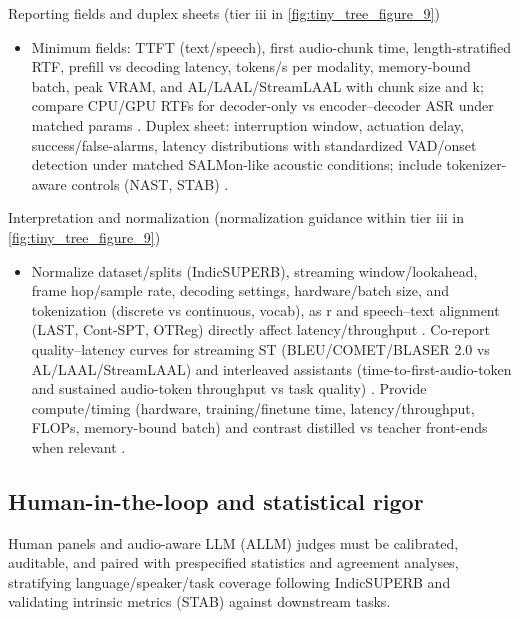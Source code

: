 \documentclass{article}
\begin{document}
Reporting fields and duplex sheets (tier iii in \autoref{fig:tiny_tree_figure_9})
\begin{itemize}
  \item Minimum fields: TTFT (text/speech), first audio-chunk time, length-stratified RTF, prefill vs decoding latency, tokens/s per modality, memory-bound batch, peak VRAM, and AL/LAAL/StreamLAAL with chunk size and k; compare CPU/GPU RTFs for decoder-only vs encoder--decoder ASR under matched params \cite{tsunoo2024decoderonlyarchitecturespeechrecognition}. Duplex sheet: interruption window, actuation delay, success/false-alarms, latency distributions with standardized VAD/onset detection under matched SALMon-like acoustic conditions; include tokenizer-aware controls (NAST, STAB) \cite{messica2024nastnoiseawarespeechtokenizationlanguage,maimon2025salmonsuiteacousticlanguagemodelevaluati,vashishth2024stabspeechtokenizerassessmentbenchmark}.
\end{itemize}

Interpretation and normalization (normalization guidance within tier iii in \autoref{fig:tiny_tree_figure_9})
\begin{itemize}
  \item Normalize dataset/splits (IndicSUPERB), streaming window/lookahead, frame hop/sample rate, decoding settings, hardware/batch size, and tokenization (discrete vs continuous, vocab), as r and speech--text alignment (LAST, Cont-SPT, OTReg) directly affect latency/throughput \cite{turetzky2024lastlanguagemodelawarespeechtokenization,li2025continuousspeechtokenizertext,xu2025optimaltransportregularizationspeechtext}. Co-report quality--latency curves for streaming ST (BLEU/COMET/BLASER 2.0 vs AL/LAAL/StreamLAAL) and interleaved assistants (time-to-first-audio-token and sustained audio-token throughput vs task quality) \cite{maimon2025scalinganalysisinterleavedspeechtextlang,guo2025streamuniachievingstreamingspeechtransla,chen2024bestowefficientstreamablespeechlanguagem,zhao2024textlessstreamingspeechtranslationsemant}. Provide compute/timing (hardware, training/finetune time, latency/throughput, FLOPs, memory-bound batch) and contrast distilled vs teacher front-ends when relevant \cite{maimon2025slammingtrainingspeechlanguagemodelonegp}.
\end{itemize}

\subsection{Human-in-the-loop and statistical rigor} \label{subsec:Human-in-the-loop and statistical rigor}
Human panels and audio-aware LLM (ALLM) judges must be calibrated, auditable, and paired with prespecified statistics and agreement analyses, stratifying language/speaker/task coverage following IndicSUPERB and validating intrinsic metrics (STAB) against downstream tasks.
\end{document}
